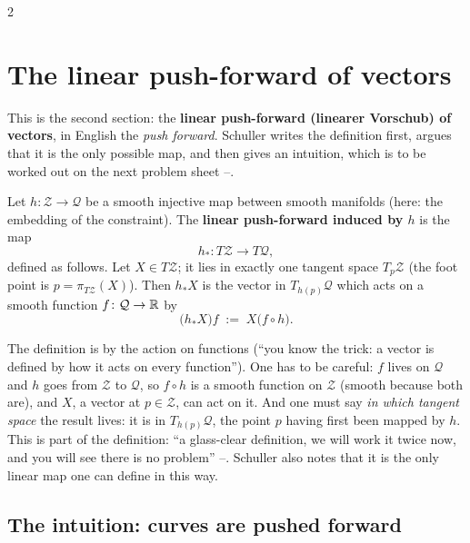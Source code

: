 \begin{paracol}{2}
\section{The linear push-forward of vectors}\label{sec:zw-pushforward}

This is the second section: the \textbf{linear push-forward (linearer Vorschub) of vectors}, in English the \emph{push forward}. Schuller writes the definition first, argues that it is the only possible map, and then gives an intuition, which is to be worked out on the next problem sheet --.

\begin{definition}\label{def:zw-pushforward}
Let $h\colon\mathcal Z\to\mathcal Q$ be a smooth injective map between smooth manifolds (here: the embedding of the constraint). The \textbf{linear push-forward induced by $h$} is the map
\[
  h_*\colon T\mathcal Z\to T\mathcal Q ,
\]
defined as follows. Let $X\in T\mathcal Z$; it lies in exactly one tangent space $T_p\mathcal Z$ (the foot point is $p=\pi_{T\mathcal Z}(X)$). Then $h_*X$ is the vector in $T_{h(p)}\mathcal Q$ which acts on a smooth function $f\colon\mathcal Q\to\mathbb{R}$ by
\begin{equation}\label{eq:zw-pushforward}
  \bigl(h_*X\bigr)f\;:=\;X\bigl(f\circ h\bigr).
\end{equation}
\end{definition}
The definition is by the action on functions (``you know the trick: a vector is defined by how it acts on every function''). One has to be careful: $f$ lives on $\mathcal Q$ and $h$ goes from $\mathcal Z$ to $\mathcal Q$, so $f\circ h$ is a smooth function on $\mathcal Z$ (smooth because both are), and $X$, a vector at $p\in\mathcal Z$, can act on it. And one must say \emph{in which tangent space} the result lives: it is in $T_{h(p)}\mathcal Q$, the point $p$ having first been mapped by $h$. This is part of the definition: ``a glass-clear definition, we will work it twice now, and you will see there is no problem'' --. Schuller also notes that it is the only linear map one can define in this way.

\subsection{The intuition: curves are pushed forward}\label{ssec:zw-intuition}


\end{paracol}
